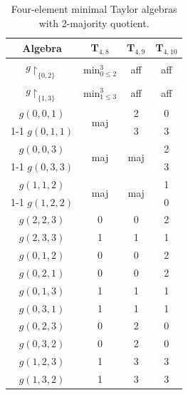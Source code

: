 \documentclass[11pt]{amsart}
\theoremstyle{definition}
\theoremstyle{remark}
\theoremstyle{plain}
\def\T{\mathbf{T}}
\begin{document}
\begin{table}[H]
\centering
\begin{tabular}{|c||c|c|c|}
\hline
    Algebra & $\T_{4,8}$ & $\T_{4,9}$ & $\T_{4,10}$ \\
\hline\hline
     $g{\restriction_{\{0,2\}}}$  & $\text{min}^3_{0\leqslant 2}$& aff & aff  \\
\hline
    $g{\restriction_{\{1,3\}}}$  & $\text{min}^3_{1\leqslant 3}$ & aff & aff\\

\hline
	$g(0,0,1)$ & \multirow{2}{*}{maj} & 2 & 0 \\
\cline{1-1} \cline{3-4}
	$g(0,1,1)$ &  & 3 & 3 \\	
\hline

    $g(0,0,3)$  & \multirow{2}{*}{maj} & \multirow{2}{*}{maj} & 2  \\
\cline{1-1} \cline{4-4}
	$g(0,3,3)$  &  &  & 3 \\
\hline

$g(1,1,2)$  & \multirow{2}{*}{maj} & \multirow{2}{*}{maj} & 1  \\
\cline{1-1} \cline{4-4}
	$g(1,2,2)$  &  &  & 0 \\
\hline
 
	$g(2,2,3)$ & 0 & 0 & 2 \\
\hline
	$g(2,3,3)$ & 1 & 1 & 1 \\

\hline
	$g(0,1,2)$ & 0 & 0 & 2\\
\hline
	$g(0,2,1)$ & 0 & 0 & 2 \\
\hline
	$g(0,1,3)$ & 1 & 1 & 1 \\
\hline
	$g(0,3,1)$ & 1 & 1 & 1 \\
\hline
	$g(0,2,3)$ & 0 & 2 & 0 \\
\hline
	$g(0,3,2)$ & 0 & 2 & 0 \\
\hline
	$g(1,2,3)$ & 1 & 3 & 3 \\
\hline
	$g(1,3,2)$ & 1 & 3 & 3 \\
\hline
\end{tabular} 
\caption{Four-element minimal Taylor algebras with 2-majority quotient.}
\label{table:7}
\end{table}
\end{document}
